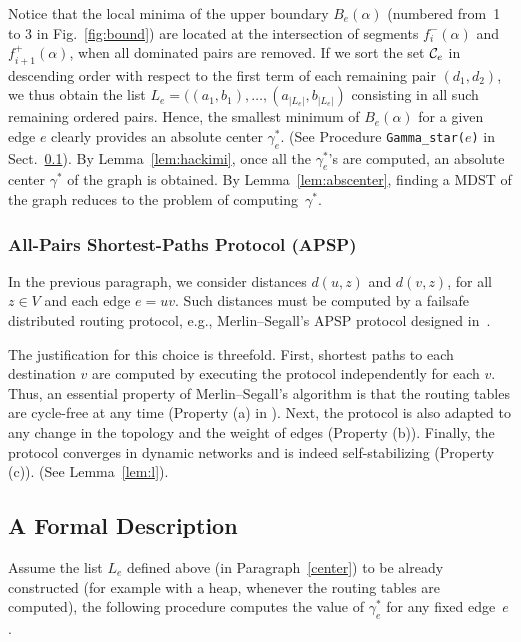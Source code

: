 \documentclass[10pt]{article}
\begin{document}
Notice that the local minima of the upper boundary $B_e (\alpha)$
(numbered from~1 to 3 in Fig.~\ref{fig:bound}) are located at the
intersection of segments $f_{i}^{-}(\alpha)$ and
$f_{i+1}^{+}(\alpha)$, when all dominated pairs are removed. If we
sort the set ${\cal C}_e$ in descending order with respect to the
first term of each remaining pair $(d_1,d_2)$, we thus obtain the list
$L_e=((a_1,b_1), \ldots ,(a_{|L_e|},b_{|L_e|})$ consisting in all such
remaining ordered pairs. Hence, the smallest minimum of $B_e (\alpha)$
for a given edge $e$ clearly provides an absolute center $\gamma^*_e$.
(See Procedure {\tt Gamma\_star($e$)} in Sect.~\ref{formal}). By
Lemma~\ref{lem:hackimi}, once all the $\gamma^*_e$'s are computed,
an absolute center $\gamma^*$ of the graph is obtained. By
Lemma~\ref{lem:abscenter}, finding a MDST of the graph reduces to
the problem of computing~$\gamma^*$.

\subsubsection{All-Pairs Shortest-Paths Protocol (APSP)}\label{apsp}\hfill

\noindent
In the previous paragraph, we consider distances
$d(u,z)$ and $d(v,z)$, for all $z\in V$ and each edge $e=uv$. Such
distances must be computed by a failsafe distributed routing protocol,
e.g., Merlin--Segall's APSP protocol designed in~\cite{MeSe79}.

The justification for this choice is threefold. First, shortest paths
to each destination $v$ are computed by executing the protocol
independently for each $v$. Thus, an essential property of
Merlin--Segall's algorithm is that the routing tables are cycle-free
at any time (Property (a) in \cite{MeSe79}).  Next, the protocol is
also adapted to any change in the topology and the weight of edges
(Property (b)).  Finally, the protocol converges in dynamic networks
and is indeed self-stabilizing (Property (c)). (See
Lemma~\ref{lem:l}).

\subsection{A Formal Description}\label{formal}
Assume the list $L_e$ defined above (in Paragraph~\ref{center}) to be
already constructed (for example with a heap,
whenever the routing tables are computed), the following procedure computes
the value of $\gamma^*_e$ for any fixed edge~$e$.
\end{document}
